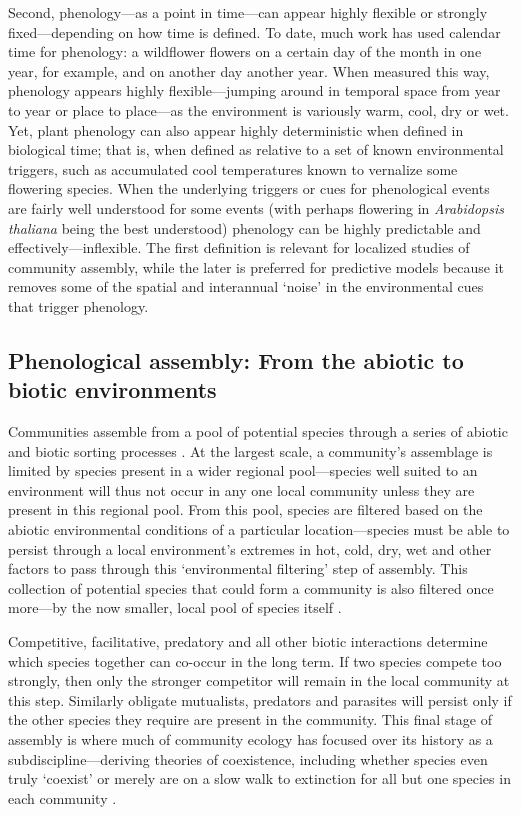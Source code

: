 \documentclass[11pt]{article}
\begin{document}
Second, phenology---as a point in time---can appear highly flexible or strongly fixed---depending on how time is defined. To date, much work has used calendar time for phenology: a wildflower flowers on a certain day of the month in one year, for example, and on another day another year. When measured this way, phenology appears highly flexible---jumping around in temporal space from year to year or place to place---as the environment is variously warm, cool, dry or wet. Yet, plant phenology can also appear highly deterministic when defined in biological time; that is, when defined as relative to a set of known environmental triggers, such as accumulated cool temperatures known to vernalize some flowering species. When the underlying triggers or cues for phenological events are fairly well understood for some events (with perhaps flowering in \emph{Arabidopsis thaliana} being the best understood) phenology can be highly predictable and effectively---inflexible. The first definition is relevant for localized studies of community assembly, while the later is preferred for predictive models because it removes some of the spatial and interannual `noise' in the environmental cues that trigger phenology.

\subsection*{Phenological assembly: From the abiotic to biotic environments} 

Communities assemble from a pool of potential species through a series of abiotic and biotic sorting processes \citep{hillerislambers2012rethinking}. At the largest scale, a community's assemblage is limited by species present in a wider regional pool---species well suited to an environment will thus not occur in any one local community unless they are present in this regional pool. From this pool, species are filtered based on the abiotic environmental conditions of a particular location---species must be able to persist through a local environment's extremes in hot, cold, dry, wet and other factors to pass through this `environmental filtering' step of assembly. This collection of potential species that could form a community is also filtered once more---by the now smaller, local pool of species itself \citep{hillerislambers2012rethinking}. 

Competitive, facilitative, predatory and all other biotic interactions determine which species together can co-occur in the long term. If two species compete too strongly, then only the stronger competitor will remain in the local community at this step. Similarly obligate mutualists, predators and parasites will persist only if the other species they require are present in the community. This final stage of assembly is where much of community ecology has focused over its history as a subdiscipline---deriving theories of coexistence, including whether species even truly `coexist' or merely are on a slow walk to extinction for all but one species in each community \citep{Hubbell:2001vo}. 
\end{document}
